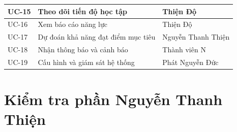 \documentclass[12pt,a4paper]{article}
\begin{document}
\begin{longtable}{
			|>{\centering\arraybackslash}p{1.6cm}
			|p{8.3cm}
			|p{4.3cm}|
		}
		UC-15 & Theo dõi tiến độ học tập & Thiện Độ \\
		\hline
		
		UC-16 & Xem báo cáo năng lực & Thiện Độ \\
		\hline
		
		UC-17 & Dự đoán khả năng đạt điểm mục tiêu & Nguyễn Thanh Thiện \\
		\hline
		
		UC-18 & Nhận thông báo và cảnh báo & Thành viên N \\
		\hline
		
		UC-19 & Cấu hình và giám sát hệ thống & Phát Nguyễn Đức \\
		\hline
		
	\end{longtable}
	
	\section{Kiểm tra phần Nguyễn Thanh Thiện}
	
\end{document}
